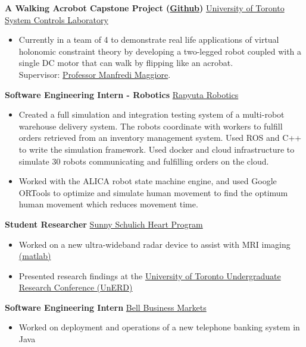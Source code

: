 \documentclass[10pt, a4paper]{cv}
\begin{document}
	\textbf{A Walking Acrobot  Capstone Project (\href{https://github.com/Vuwij/acrobot}{Github})} \hfill \href{https://www.control.utoronto.ca/}{University of Toronto System Controls Laboratory}
	\begin{itemize}
		\item Currently in a team of 4 to demonstrate real life applications of virtual holonomic constraint theory by developing a two-legged robot coupled with a single DC motor that can walk by flipping like an acrobat.\\ Supervisor: \href{https://www.control.utoronto.ca/~maggiore/}{Professor Manfredi Maggiore}.
	\end{itemize}

	\textbf{Software Engineering Intern - Robotics} \hfill \href{https://www.rapyuta-robotics.com}{Rapyuta Robotics}
	\begin{itemize}
		\item Created a full simulation and integration testing system of a multi-robot warehouse delivery system. The robots coordinate with workers to fulfill orders retrieved from an inventory management system. Used ROS and C++ to write the simulation framework. Used docker and cloud infrastructure to simulate 30 robots communicating and fulfilling orders on the cloud.
		\item Worked with the ALICA robot state machine engine, and used Google ORTools to optimize and simulate human movement to find the optimum human movement which reduces movement time.
	\end{itemize}

	\textbf{Student Researcher} \hfill \href{https://sunnybrook.ca/content/?page=schulich-heart-centre}{Sunny Schulich Heart Program}
	\begin{itemize}
		\item Worked on a new ultra-wideband radar device to assist with MRI imaging \href{https://github.com/Vuwij/CPRadar}{(matlab)}
		\item Presented research findings at the \href{https://www.facebook.com/UnERD2019/?ref=py_c}{University of Toronto Undergraduate Research Conference (UnERD)}
	\end{itemize}

	\textbf{Software Engineering Intern} \hfill \href{https://www.rapyuta-robotics.com}{Bell Business Markets}
	\begin{itemize}
		\item Worked on deployment and operations of a new telephone banking system in Java
	\end{itemize}
\end{document}
